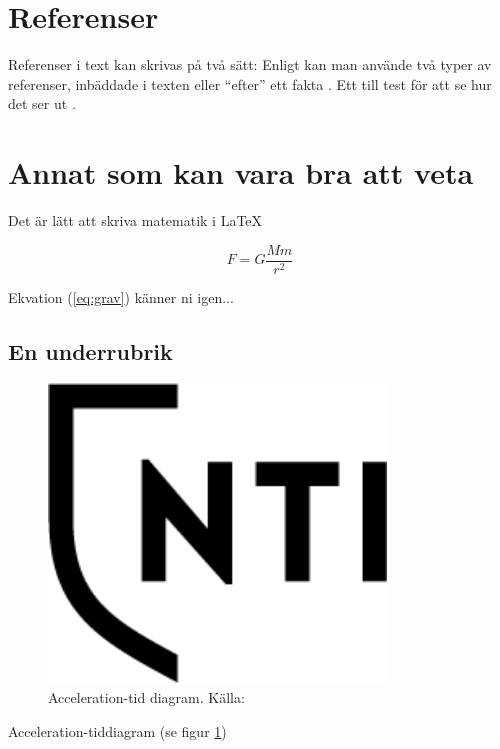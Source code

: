 \documentclass[11p]{article}
\begin{document}
\section{Referenser}
Referenser i text kan skrivas på två sätt: Enligt \textcite{} kan man använde två typer av referenser, inbäddade i texten eller ``efter'' ett fakta \parencite{Fraenkel}. Ett till test för att se hur det ser ut \parencite{fermi}.

\section{Annat som kan vara bra att veta}
Det är lätt att skriva matematik i \LaTeX

\begin{equation}
    F = G \frac{M m}{r^2}
    \label{eq:grav}
\end{equation}

Ekvation (\ref{eq:grav}) känner ni igen...
\clearpage
\subsection{En underrubrik}
    \begin{figure}[!h]
        \includegraphics[width=0.8\textwidth]{images/NTI Gymnasiet_Symbol_print_svart}
        \caption{Acceleration-tid diagram. Källa: \textcite{Fraenkel}}
        \label{fig:acc}
    \end{figure}

Acceleration-tiddiagram (se figur \ref{fig:acc})

\printbibliography
\end{document}
